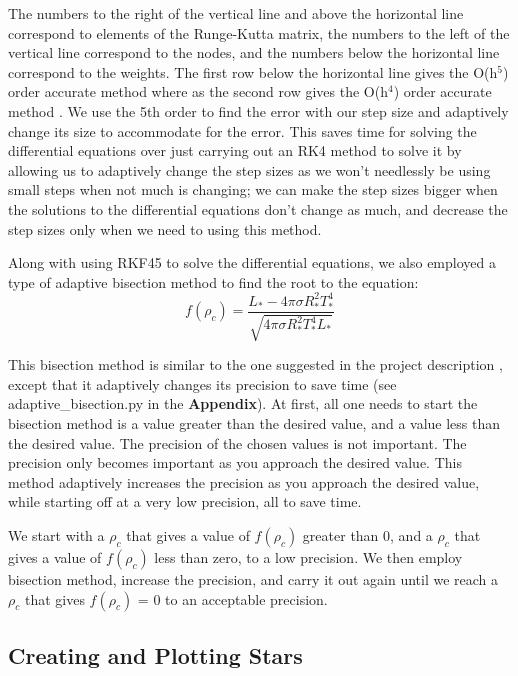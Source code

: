 \documentclass[11pt]{article}
\begin{document}
The numbers to the right of the vertical line and above the horizontal line correspond to elements of the Runge-Kutta matrix, the numbers to the left of the vertical line correspond to the nodes, and the numbers below the horizontal line correspond to the weights. The first row below the horizontal line gives the O(h$^5$) order accurate method where as the second row gives the O(h$^4$) order accurate method \cite{DE}. We use the 5th order to find the error with our step size and adaptively change its size to accommodate for the error. This saves time for solving the differential equations over just carrying out an RK4 method to solve it by allowing us to adaptively change the step sizes as we won't needlessly be using small steps when not much is changing; we can make the step sizes bigger when the solutions to the differential equations don't change as much, and decrease the step sizes only when we need to using this method.

Along with using RKF45 to solve the differential equations, we also employed a type of adaptive bisection method to find the root to the equation:
\begin{equation}
f(\rho_c) = \frac{L_* - 4 \pi \sigma R_*^2 T_*^4}{\sqrt{4 \pi \sigma R_*^2 T_*^4 L_*}}
\end{equation} \label{f_rho}

This bisection method is similar to the one suggested in the project description \cite{manual}, except that it adaptively changes its precision to save time (see adaptive\_bisection.py in the \textbf{Appendix}). At first, all one needs to start the bisection method is a value greater than the desired value, and a value less than the desired value. The precision of the chosen values is not important. The precision only becomes important as you approach the desired value. This method adaptively increases the precision as you approach the desired value, while starting off at a very low precision, all to save time. 

We start with a $\rho_c$ that gives a value of $f(\rho_c)$ greater than 0, and a $\rho_c$ that gives a value of $f(\rho_c)$ less than zero, to a low precision. We then employ bisection method, increase the precision, and carry it out again until we reach a $\rho_c$ that gives $f(\rho_c)$ = 0 to an acceptable precision.

\newpage

\subsection{Creating and Plotting Stars}
\end{document}
